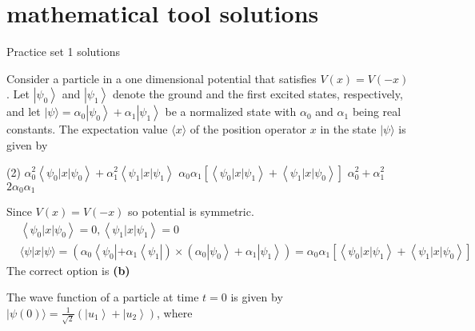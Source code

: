 \chapter{mathematical tool solutions}
\begin{abox}
	Practice set 1 solutions
	\end{abox}
\begin{enumerate}
	\begin{minipage}{\textwidth}
		\item Consider a particle in a one dimensional potential that satisfies $V(x)=V(-x)$. Let $\left|\psi_{0}\right\rangle$ and $\left|\psi_{1}\right\rangle$ denote the ground and the first excited states, respectively, and let $|\psi\rangle=\alpha_{0}\left|\psi_{0}\right\rangle+\alpha_{1}\left|\psi_{1}\right\rangle$ be a normalized state with $\alpha_{0}$ and $\alpha_{1}$ being real constants. The expectation value $\langle x\rangle$ of the position operator $x$ in the state $|\psi\rangle$ is given by
	\end{minipage}
	\begin{tasks}(2)
		\task[\textbf{A.}] $\alpha_{0}^{2}\left\langle\psi_{0}|x| \psi_{0}\right\rangle+\alpha_{1}^{2}\left\langle\psi_{1}|x| \psi_{1}\right\rangle$
		\task[\textbf{B.}]$\alpha_{0} \alpha_{1}\left[\left\langle\psi_{0}|x| \psi_{1}\right\rangle+\left\langle\psi_{1}|x| \psi_{0}\right\rangle\right]$
		\task[\textbf{C.}]$\alpha_{0}^{2}+\alpha_{1}^{2}$
		\task[\textbf{D.}]$2 \alpha_{0} \alpha_{1}$
	\end{tasks}
\begin{answer}
 Since $V(x)=V(-x)$ so potential is symmetric.
	$$
	\begin{aligned}
	&\left\langle\psi_{0}|x| \psi_{0}\right\rangle=0,\left\langle\psi_{1}|x| \psi_{1}\right\rangle=0 \\
	&\langle\psi|x| \psi\rangle=\left(\alpha _ { 0 } \left\langle\psi_{0}\left|+\alpha_{1}\left\langle\psi_{1}\right|\right) \times\left(\alpha_{0}\left|\psi_{0}\right\rangle+\alpha_{1}\left|\psi_{1}\right\rangle\right)=\alpha_{0} \alpha_{1}\left[\left\langle\psi_{0}|x| \psi_{1}\right\rangle+\left\langle\psi_{1}|x| \psi_{0}\right\rangle\right]\right.\right.
	\end{aligned}
	$$
	The correct option is \textbf{(b)}
\end{answer}
\begin{minipage}{\textwidth}
	\item The wave function of a particle at time $t=0$ is given by $|\psi(0)\rangle=\frac{1}{\sqrt{2}}\left(\left|u_{1}\right\rangle+\left|u_{2}\right\rangle\right)$, where

\end{minipage}
\end{enumerate}
